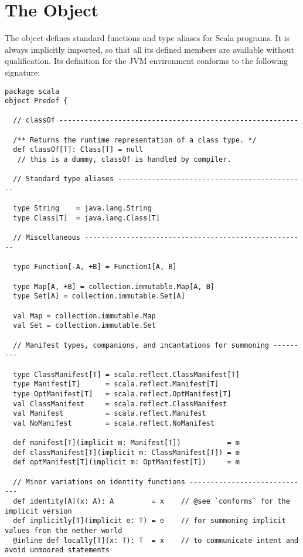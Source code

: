 \newpage
\section{The \large{} Object}\label{cls:predef}

The  object defines standard functions and type aliases
for Scala programs. It is always implicitly imported, so that all its
defined members are available without qualification. Its definition
for the JVM environment conforms to the following signature:

\begin{lstlisting}
package scala
object Predef {

  // classOf ---------------------------------------------------------

  /** Returns the runtime representation of a class type. */
  def classOf[T]: Class[T] = null  
   // this is a dummy, classOf is handled by compiler.

  // Standard type aliases ---------------------------------------------

  type String    = java.lang.String
  type Class[T]  = java.lang.Class[T]

  // Miscellaneous -----------------------------------------------------
  
  type Function[-A, +B] = Function1[A, B]

  type Map[A, +B] = collection.immutable.Map[A, B]
  type Set[A] = collection.immutable.Set[A]

  val Map = collection.immutable.Map
  val Set = collection.immutable.Set

  // Manifest types, companions, and incantations for summoning ---------

  type ClassManifest[T] = scala.reflect.ClassManifest[T]
  type Manifest[T]      = scala.reflect.Manifest[T]
  type OptManifest[T]   = scala.reflect.OptManifest[T]
  val ClassManifest     = scala.reflect.ClassManifest
  val Manifest          = scala.reflect.Manifest
  val NoManifest        = scala.reflect.NoManifest
  
  def manifest[T](implicit m: Manifest[T])           = m
  def classManifest[T](implicit m: ClassManifest[T]) = m
  def optManifest[T](implicit m: OptManifest[T])     = m

  // Minor variations on identity functions -----------------------------
  def identity[A](x: A): A         = x    // @see `conforms` for the implicit version
  def implicitly[T](implicit e: T) = e    // for summoning implicit values from the nether world
  @inline def locally[T](x: T): T  = x    // to communicate intent and avoid unmoored statements


\end{lstlisting}
